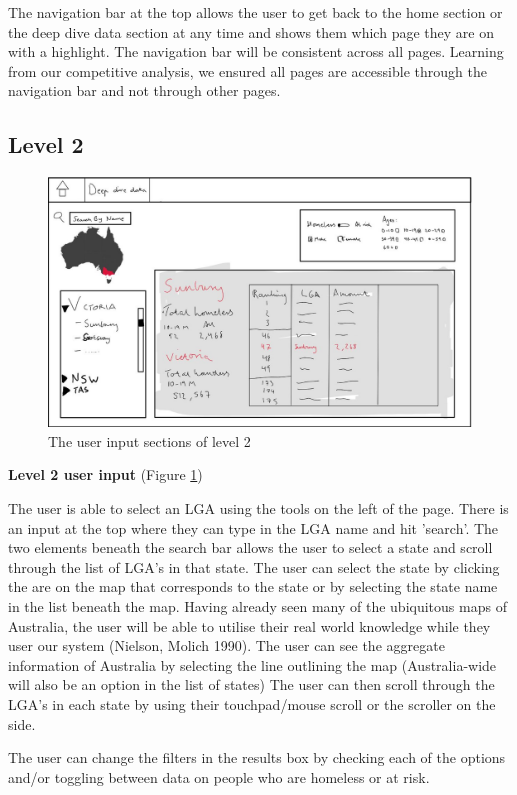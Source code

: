 \documentclass[12pt, a4paper]{article}
\begin{document}
The navigation bar at the top allows the user to get back to the home section or the deep dive data section at any time and shows them which page they are on with a highlight. The navigation bar will be consistent across all pages. Learning from our competitive analysis, we ensured all pages are accessible through the navigation bar and not through other pages.

\subsection{Level 2}
\begin{figure}[h]
\centering
\includegraphics[scale=.6]{level2outer.png} 
\caption{The user input sections of level 2}
\label{fig:2outer}
\end{figure}
\textbf{Level 2 user input} (Figure \ref{fig:2outer}) 

The user is able to select an LGA using the tools on the left of the page. There is an input at the top where they can type in the LGA name and hit 'search'. The two elements beneath the search bar allows the user to select a state and scroll through the list of LGA's in that state. The user can select the state by clicking the are on the map that corresponds to the state or by selecting the state name in the list beneath the map. Having already seen many of the ubiquitous maps of Australia, the user will be able to utilise their real world knowledge while they user our system  (Nielson, Molich 1990). The user can see the aggregate information of Australia by selecting the line outlining the map (Australia-wide will also be an option in the list of states) The user can then scroll through the LGA's in each state by using their touchpad/mouse scroll or the scroller on the side. 

The user can change the filters in the results box by checking each of the options and/or toggling between data on people who are homeless or at risk. 
\end{document}
